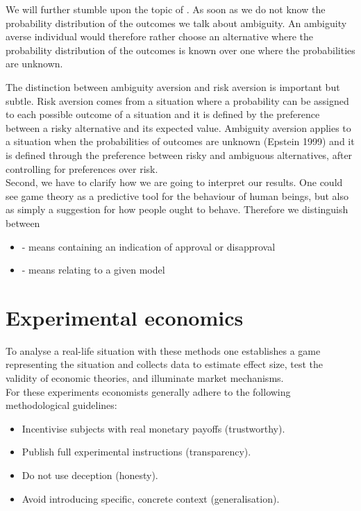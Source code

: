 We will further stumble upon the topic of . As soon as we do not know the probability distribution of the outcomes we talk about ambiguity. An ambiguity averse individual would therefore  rather choose an alternative where the probability distribution of the outcomes is known over one where the probabilities are unknown.

The distinction between ambiguity aversion and risk aversion is important but subtle. Risk aversion comes from a situation where a probability can be assigned to each possible outcome of a situation and it is defined by the preference between a risky alternative and its expected value. Ambiguity aversion applies to a situation when the probabilities of outcomes are unknown (Epstein 1999) and it is defined through the preference between risky and ambiguous alternatives, after controlling for preferences over risk. \\


Second, we have to clarify how we are going to interpret our results. One could see game theory as a predictive tool for the behaviour of human beings, but also as simply a suggestion for how people ought to behave. Therefore we distinguish between
\begin{itemize}
	\item {} - means containing an indication of approval or disapproval
	\item {} - means relating to a given model
\end{itemize}
	
\newpage %

\section{Experimental economics} 
To analyse a real-life situation with these methods one establishes a game representing the situation and collects data to estimate effect size, test the validity of economic theories, and illuminate market mechanisms. \\
For these experiments economists generally adhere to the following methodological guidelines:
	\begin{itemize}
		\item Incentivise subjects with real monetary payoffs (trustworthy).
		\item Publish full experimental instructions (transparency).
		\item Do not use deception (honesty).
		\item Avoid introducing specific, concrete context (generalisation).
	\end{itemize}


\newpage